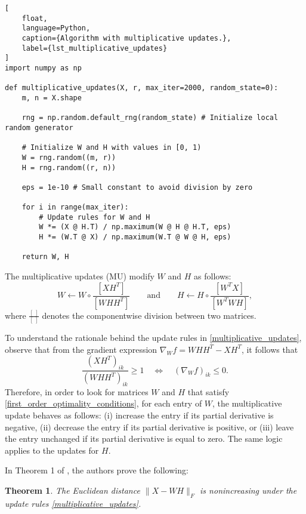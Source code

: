 \documentclass{amsart}
\newtheorem{theo}{Theorem}
\begin{document}
\begin{lstlisting}[
    float,
    language=Python,
    caption={Algorithm with multiplicative updates.},
    label={lst_multiplicative_updates}
]
import numpy as np

def multiplicative_updates(X, r, max_iter=2000, random_state=0):
    m, n = X.shape

    rng = np.random.default_rng(random_state) # Initialize local random generator

    # Initialize W and H with values in [0, 1)
    W = rng.random((m, r))
    H = rng.random((r, n)) 
    
    eps = 1e-10 # Small constant to avoid division by zero

    for i in range(max_iter):
        # Update rules for W and H
        W *= (X @ H.T) / np.maximum(W @ H @ H.T, eps)
        H *= (W.T @ X) / np.maximum(W.T @ W @ H, eps)

    return W, H
\end{lstlisting}

The multiplicative updates (MU) modify $W$ and $H$ as follows:
\begin{equation}
    \label{multiplicative_updates}
    W \leftarrow W\circ \frac{\left[XH^T\right]}{\left[WHH^T\right]} \qquad \text{and}\qquad H \leftarrow H\circ \frac{\left[W^TX\right]}{\left[W^TWH\right]},
\end{equation}
where $\frac{[\ ]}{[\ ]}$ denotes the componentwise division between two matrices.

\bigskip

To understand the rationale behind the update rules in \eqref{multiplicative_updates}, observe that from the gradient expression $\nabla_W f= WHH^T-XH^T$, it follows that
\[
    \frac{(XH^T)_{ik}}{(WHH^T)_{ik}}\geq 1 \quad \Leftrightarrow \quad (\nabla_W f)_{ik}\leq 0.
\]
Therefore, in order to look for matrices $W$ and $H$ that satisfy \eqref{first_order_optimality_conditions}, for each entry of $W$, the multiplicative update behaves as follows:
(i) increase the entry if its partial derivative is negative,
(ii) decrease the entry if its partial derivative is positive, or
(iii) leave the entry unchanged if its partial derivative is equal to zero. The same logic applies to the updates for $H$.

In Theorem 1 of \cite{LS}, the authors prove the following:

\begin{theo}
    The Euclidean distance $\|X-WH\|_F$ is nonincreasing under the update rules \eqref{multiplicative_updates}.
\end{theo}
\end{document}

